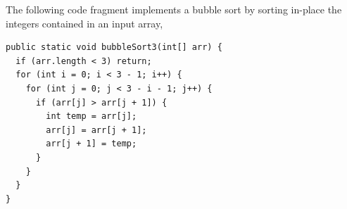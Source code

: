 \documentclass[addpoints, answers]{exam}
\newcommand{\Code}[1]{\texttt{#1}}
\begin{document}
\begin{questions}
\begin{solution}
\begin{itemize}
      \end{itemize}
  \end{solution}

\newpage

\question The following code fragment implements a bubble sort by
  sorting in-place the integers contained in an input array,

\begin{verbatim}
public static void bubbleSort3(int[] arr) {
  if (arr.length < 3) return;
  for (int i = 0; i < 3 - 1; i++) {
    for (int j = 0; j < 3 - i - 1; j++) {
      if (arr[j] > arr[j + 1]) {
        int temp = arr[j];
        arr[j] = arr[j + 1];
        arr[j + 1] = temp;
      }
    }
  }
}
\end{verbatim}

  \begin{parts}

\end{parts}
\end{questions}
\end{document}
